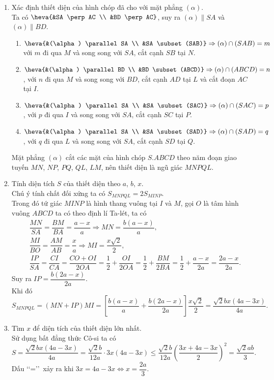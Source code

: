 \begin{ex}
{\begin{enumerate}
			\item Xác định  thiết diện của hình chóp đã cho với mặt phẳng $(\alpha)$.\\
			Ta có $\heva{&SA \perp AC \\  &BD \perp AC}
			$,  suy ra $(\alpha) \parallel SA$ và $(\alpha) \parallel BD$.
			\begin{enumerate}
				\item $\heva{&(\alpha) \parallel SA \\ &SA \subset (SAB)} \Rightarrow (\alpha) \cap (SAB) = m$ với $m$ đi qua $M$ và song song với $SA$, cắt cạnh $SB$ tại $N$. 
				\item $\heva{&(\alpha)  \parallel BD \\ &BD \subset (ABCD)} \Rightarrow (\alpha) \cap (ABCD) = n$, với $n$ đi qua $M$ và song song với $BD$, cắt cạnh $AD$ tại $L$ và cắt đoạn $AC$ tại $I$.
				\item $\heva{&(\alpha) \parallel SA \\ &SA \subset (SAC)} \Rightarrow (\alpha) \cap (SAC) = p$, với $p$ đi qua $I$ và song  song với $SA$, cắt cạnh $SC$ tại $P$.
				\item $\heva{&(\alpha) \parallel SA \\ &SA \subset (SAD)} \Rightarrow  (\alpha) \cap (SAD) = q$, với $q$ đi qua $L$ và song song với $SA$, cắt cạnh $SD$ tại $Q$.
			\end{enumerate}
			Mặt phẳng $(\alpha)$ cắt các mặt  của hình chóp $S.ABCD$ theo năm đoạn giao tuyến $MN$, $NP$, $PQ$, $QL$, $LM$, nên thiết diện là ngũ giác $MNPQL$.
			\item Tính diện tích $S$ của thiết diện theo $a$, $b$, $x$.\\ 
			Chú ý tính chất  đối xứng ta có $S_{MNPQL} = 2S_{MINP}$.\\
			Trong đó tứ giác $MINP$ là hình  thang vuông tại $I$ và $M$, gọi $O$ là tâm hình vuông $ABCD$ ta có theo định lí Ta-lét, ta có
			 \allowdisplaybreaks
			\begin{eqnarray*}
				 &&\dfrac{MN}{SA} = \dfrac{BM}{BA} = \dfrac{a-x}{a} \Rightarrow MN=\dfrac{b(a-x)}{a},\\[5pt]
				&&\dfrac{MI}{BO} = \dfrac{AM}{AB} = \dfrac{x}{a}  \Rightarrow MI=\dfrac{x\sqrt{2}}{2},\\[5pt]
				&&\dfrac{IP}{SA} = \dfrac{CI}{CA}  = \dfrac{CO+OI}{2OA} = \dfrac{1}{2}+\dfrac{OI}{2OA}
				= \dfrac{1}{2}+\dfrac{BM}{2BA} = \dfrac{1}{2}+\dfrac{a-x}{2a} =  \dfrac{2a-x}{2a}.
			\end{eqnarray*}
			Suy ra $IP=\dfrac{b(2a-x)}{2a}$.\\ 
			Khi  đó
			\[S_{MNPQL}=(MN+IP)MI=\left[\dfrac{b(a-x)}{a}+\dfrac{b(2a-x)}{2a}\right]\dfrac{x\sqrt{2}}{2}=\dfrac{\sqrt{2}bx(4a-3x)}{4a}.\] 
			\item Tìm $x$ để diện tích của  thiết diện lớn nhất.\\
			Sử dụng bất  đẳng thức Cô-si ta có
			\[S=\dfrac{\sqrt{2}bx(4a-3x)}{4a}=\dfrac{\sqrt{2}b}{12a}\cdot  3x(4a-3x)\le\dfrac{\sqrt{2}b}{12a}\left(\dfrac{3x+4a-3x}{2}\right)^{2}=\dfrac{\sqrt{2}ab}{3}.\]
			Dấu \lq\lq=\rq\rq\,  xảy ra khi $3x = 4a-3x \Leftrightarrow x = \dfrac{2a}{3}$.
		\end{enumerate}
	 }
\end{ex}

